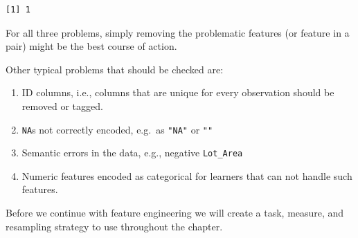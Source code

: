 \begin{verbatim}
[1] 1
\end{verbatim}

For all three problems, simply removing the problematic features (or
feature in a pair) might be the best course of action.

\begin{Shaded}
\begin{Highlighting}[]
\OtherTok{=} \NormalTok{(}\NormalTok{, }\NormalTok{, }\NormalTok{)}
\end{Highlighting}
\end{Shaded}

Other typical problems that should be checked are:

\begin{enumerate}
\def\labelenumi{\arabic{enumi}.}
\tightlist
\item
  ID columns, i.e., columns that are unique for every observation should
  be removed or tagged.
\item
  \texttt{NA}s not correctly encoded, e.g.~as \texttt{"NA"} or
  \texttt{""}
\item
  Semantic errors in the data, e.g., negative \texttt{Lot\_Area}
\item
  Numeric features encoded as categorical for learners that can not
  handle such features.
\end{enumerate}

Before we continue with feature engineering we will create a task,
measure, and resampling strategy to use throughout the chapter.

\begin{Shaded}
\begin{Highlighting}[]
\OtherTok{=}  \NormalTok{, } \NormalTok{)}
\SpecialCharTok{$}\NormalTok{(}\SpecialCharTok{$}

\OtherTok{=} \NormalTok{(}\NormalTok{)}
\OtherTok{=} \NormalTok{(}\NormalTok{, } \NormalTok{)}
\SpecialCharTok{$}
\end{Highlighting}
\end{Shaded}

